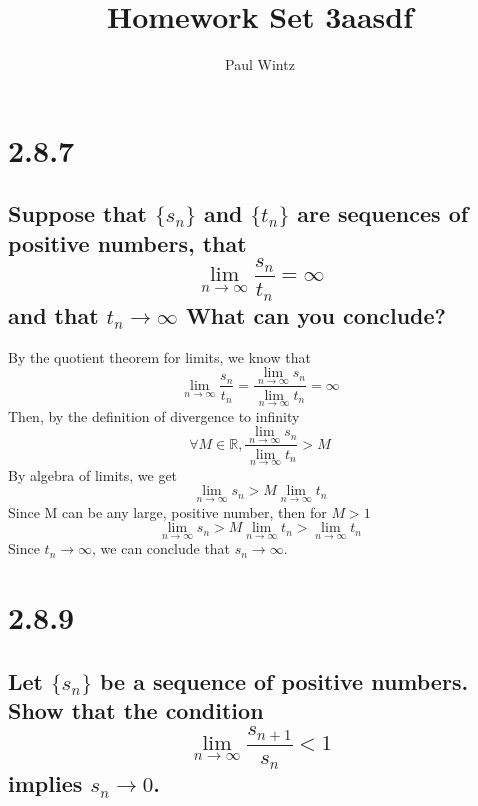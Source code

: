 \documentclass[11pt]{article}
\begin{document}
	\author{Paul Wintz}
	\title{Homework Set 3aasdf}
	\maketitle
	
	\newcommand{\limittoinfy}[2]{\lim_{#1 \to \infty}#2}
	\newcommand{\limittoinfyn}[1]{\lim_{n \to \infty}#1}
	\def \limsup {\lim_{n \to \infty}sup}
	\def \liminf {\lim_{n \to \infty}inf}
	\newcommand{\sumto}[1]{\sum_{n=1}^{#1}}
	\def \sumtoinfy {\sum_{n=1}^{\infty}}

	\newcommand{\set}[1]{\{#1\}}
	\def \sn {s_n}
	\def \tn {t_n}
	\def \xn {x_n}
	\def \an {a_n}
	\def \bn {b_n}
	
	\def \snplusone{s_{n+1}}
	\def \snfrac {\frac{\snplusone}{\sn}}
	
	\def \nfrac{\frac{1}{n}}
	\def \novernplusone {\frac{n}{n+1}}
	
	\section*{2.8.7}
	\subsection*{Suppose that $\set{\sn}$ and $\set{\tn}$ are sequences of positive numbers, that $$\limittoinfyn{\frac{\sn}{\tn}} = \infty$$ and that $\tn \rightarrow \infty$ What can you conclude?}
	
	By the quotient theorem for limits, we know that $$\limittoinfyn{\frac{\sn}{\tn}} = \frac{\limittoinfyn{\sn}}{\limittoinfyn{\tn}} = \infty$$
	Then, by the definition of divergence to infinity
	$$\forall M \in \mathbb{R}, \frac{\limittoinfyn{\sn}}{\limittoinfyn{\tn}} >M$$
	By algebra of limits, we get
	$$\limittoinfyn{\sn} > M \limittoinfyn{\tn}$$	
	Since M can be any large, positive number, then for $M > 1$
	$$\limittoinfyn{\sn} > M \limittoinfyn{\tn} > \limittoinfyn{\tn}$$
	Since $\tn \rightarrow \infty$, we can conclude that $\sn \rightarrow \infty$.
	
	\section*{2.8.9}
	\subsection*{
		Let $\set{\sn}$ be a sequence of positive numbers. Show that the condition $$\limittoinfyn{\snfrac{}} < 1$$ implies $\sn \rightarrow 0$.}
	
\end{document}
